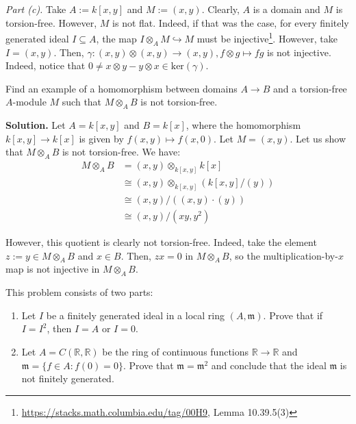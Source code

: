 \documentclass{template}
\begin{document}
\textit{Part (c).} Take $A := k[x,y]$ and $M := (x,y)$. Clearly, $A$ is
a domain and $M$ is torsion-free. However, $M$ is not flat. Indeed, if that was
the case, for every finitely generated ideal $I \subseteq A$, the map $I
\otimes_A M \hookrightarrow M$ must be injective\footnote{\url{https://stacks.math.columbia.edu/tag/00H9}, Lemma 10.39.5(3)}. However, take $I = (x,y)$.
Then, $\gamma: (x,y) \otimes (x,y) \to (x,y), f \otimes g \mapsto fg$ is not
injective. Indeed, notice that $0 \neq x \otimes y - y \otimes x \in
\text{ker}(\gamma)$.

\begin{problem}[Exercise 4]
    Find an example of a homomorphism between domains $A \to B$ and a
torsion-free $A$-module $M$ such that $M \otimes_A B$ is not torsion-free.
\end{problem}

\textbf{Solution.} Let $A = k[x,y]$ and $B = k[x]$, where the homomorphism
$k[x,y] \to k[x]$ is given by $f(x,y) \mapsto f(x,0)$. Let $M = (x,y)$. Let us
show that $M \otimes_A B$ is not torsion-free. We have:
\begin{align*}
M \otimes_A B &= (x,y) \otimes_{k[x,y]} k[x] \\
&\cong (x, y) \otimes_{k[x,y]} (k[x,y] / (y)) \\
&\cong (x, y) / ((x,y) \cdot (y)) \\
&\cong (x,y) / (xy, y^2)
\end{align*}

However, this quotient is clearly not torsion-free. Indeed, take the element $z
:= y \in M \otimes_A B$ and $x \in B$. Then, $zx = 0$ in $M \otimes_A B$, so the
multiplication-by-$x$ map is not injective in $M \otimes_A B$.

\begin{problem}[Exercise 5]
    This problem consists of two parts:
    \begin{enumerate}
        \item[(a)] Let $I$ be a finitely generated ideal in a local ring
        $(A,\mathfrak{m})$. Prove that if $I = I^2$, then $I=A$ or $I=0$.
        \item[(b)] Let $A = C(\mathbb{R}, \mathbb{R})$ be the ring of 
        continuous functions $\mathbb{R} \to \mathbb{R}$ and $\mathfrak{m} = \{f \in A: f(0)=0\}$.
        Prove that $\mathfrak{m} = \mathfrak{m}^2$ and conclude that the ideal $\mathfrak{m}$
        is not finitely generated.
    \end{enumerate}
\end{problem}
\end{document}

